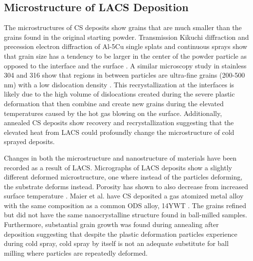 	\subsection*{Microstructure of LACS Deposition}


		The microstructures of CS deposits show grains that are much smaller than the grains found in the original starting powder. Transmission Kikuchi diffraction and precession electron diffraction of Al-5Cu single splats and continuous sprays show that grain size has a tendency to be larger in the center of the powder particle as opposed to the interface and the surface \cite{RN486, RN670}. A similar microscopy study in stainless 304 and 316 show that regions in between particles are ultra-fine grains (200-500 nm) with a low dislocation density \cite{RN1373}. This recrystallization at the interfaces is likely due to the high volume of dislocations created during the severe plastic deformation that then combine and create new grains during the elevated temperatures caused by the hot gas blowing on the surface. Additionally, annealed CS deposits show recovery and recrystallization \cite{RN461} suggesting that the elevated heat from LACS could profoundly change the microstructure of cold sprayed deposits.
		
		
		
		Changes in both the microstructure and nanostructure of materials have been recorded as a result of LACS. Micrographs of LACS deposits show a slightly different deformed microstructure, one where instead of the particles deforming, the substrate deforms instead. Porosity has shown to also decrease from increased surface temperature \cite{RN173}. Maier et al. have CS deposited a gas atomized metal alloy with the same composition as a common ODS alloy, 14YWT \cite{RN378}. The grains refined but did not have the same nanocrystalline structure found in ball-milled samples. Furthermore, substantial grain growth was found during annealing after deposition suggesting that despite the plastic deformation particles experience during cold spray, cold spray by itself is not an adequate substitute for ball milling where particles are repeatedly deformed. 
		
		
		

